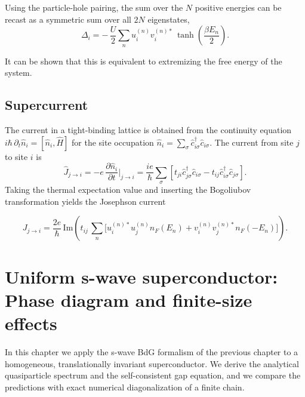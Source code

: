 \documentclass[11pt,a4paper,twoside,openany]{report}
\begin{document}
Using the particle-hole pairing, the sum over the $N$ positive energies can be recast as a symmetric sum over all $2N$ eigenstates,
\begin{equation}
  \boxed{
    \Delta_{i} = -\,\frac{U}{2} \sum_{n} u_{i}^{(n)} v_{i}^{(n)*} \,
                \tanh\!\left( \frac{\beta E_{n}}{2} \right) .
  }
  \label{eq:gap_equation_final}
\end{equation}


It can be shown that this is equivalent to extremizing the free energy of the system.




\section{Supercurrent}

The current in a tight-binding lattice is obtained from the continuity equation $i\hbar\,\partial_t  \hat{n}_i = [\hat{n}_i,\hat{H}]$ for the site occupation \(\hat{n}_i = \sum_{\sigma} \hat{c}_{i\sigma}^\dagger \hat{c}_{i\sigma}\). The current from site \(j\) to site \(i\) is
\begin{equation}
  \hat{J}_{j\to i} = -e\,\frac{\partial \hat{n}_i}{\partial t}\Big|_{j\to i}
  = \frac{ie}{\hbar} \sum_{\sigma}\left[t_{ji}\hat{c}_{j\sigma}^\dagger\hat{c}_{i\sigma}-t_{ij} \hat{c}_{i\sigma}^\dagger\hat{c}_{j\sigma}\right].
  \label{eq:J_op}
\end{equation}
Taking the thermal expectation value and inserting the Bogoliubov transformation yields the Josephson current

\begin{equation}
  \boxed{
    J_{j\to i} = \frac{2e}{\hbar}\,
    \mathrm{Im}\!\left(t_{ij}\,
      \sum_{n} \bigl[ u_{i}^{(n)*} u_{j}^{(n)} n_F(E_n)
                    + v_{i}^{(n)} v_{j}^{(n)*} n_F(-E_n) \bigr]
    \right) .
  }
  \label{eq:J_final}
\end{equation}

\chapter{Uniform s-wave superconductor: Phase diagram and finite-size effects}

In this chapter we apply the s-wave BdG formalism of the previous chapter to a homogeneous, translationally invariant superconductor.  We derive the analytical quasiparticle spectrum and the self-consistent gap equation, and we compare the predictions with exact numerical diagonalization of a finite chain.
\end{document}
